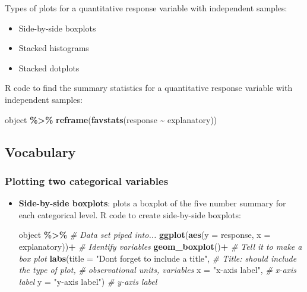 \documentclass[
]{report}
\newenvironment{Shaded}{\begin{snugshade}}{\end{snugshade}}
\newcommand{\AttributeTok}[1]{\textcolor[rgb]{0.13,0.29,0.53}{#1}}
\newcommand{\CommentTok}[1]{\textcolor[rgb]{0.56,0.35,0.01}{\textit{#1}}}
\newcommand{\FunctionTok}[1]{\textcolor[rgb]{0.13,0.29,0.53}{\textbf{#1}}}
\newcommand{\NormalTok}[1]{#1}
\newcommand{\SpecialCharTok}[1]{\textcolor[rgb]{0.81,0.36,0.00}{\textbf{#1}}}
\newcommand{\StringTok}[1]{\textcolor[rgb]{0.31,0.60,0.02}{#1}}
\begin{document}
Types of plots for a quantitative response variable with independent samples:

\begin{itemize}
\item
  Side-by-side boxplots
\item
  Stacked histograms
\item
  Stacked dotplots
\end{itemize}

R code to find the summary statistics for a quantitative response variable with independent samples:

\begin{Shaded}
\begin{Highlighting}[]
\NormalTok{object }\SpecialCharTok{\%\textgreater{}\%}
  \FunctionTok{reframe}\NormalTok{(}\FunctionTok{favstats}\NormalTok{(response }\SpecialCharTok{\textasciitilde{}}\NormalTok{ explanatory))}
\end{Highlighting}
\end{Shaded}

\subsection{Vocabulary}\label{vocabulary-9}

\subsubsection*{Plotting two categorical variables}\label{plotting-two-categorical-variables-1}

\begin{itemize}
\item
  \textbf{Side-by-side boxplots}: plots a boxplot of the five number summary for each categorical level. R code to create side-by-side boxplots:

\begin{Shaded}
\begin{Highlighting}[]
\NormalTok{object }\SpecialCharTok{\%\textgreater{}\%}  \CommentTok{\# Data set piped into...}
  \FunctionTok{ggplot}\NormalTok{(}\FunctionTok{aes}\NormalTok{(}\AttributeTok{y =}\NormalTok{ response, }\AttributeTok{x =}\NormalTok{ explanatory))}\SpecialCharTok{+}  \CommentTok{\# Identify variables}
  \FunctionTok{geom\_boxplot}\NormalTok{()}\SpecialCharTok{+}  \CommentTok{\# Tell it to make a box plot}
  \FunctionTok{labs}\NormalTok{(}\AttributeTok{title =} \StringTok{"Don\textquotesingle{}t forget to include a title"}\NormalTok{,  }\CommentTok{\# Title: should include the type of plot,}
   \CommentTok{\# observational units, variables}
   \AttributeTok{x =} \StringTok{"x{-}axis label"}\NormalTok{,    }\CommentTok{\# x{-}axis label}
   \AttributeTok{y =} \StringTok{"y{-}axis label"}\NormalTok{)  }\CommentTok{\# y{-}axis label}
\end{Highlighting}
\end{Shaded}
\end{itemize}
\end{document}
